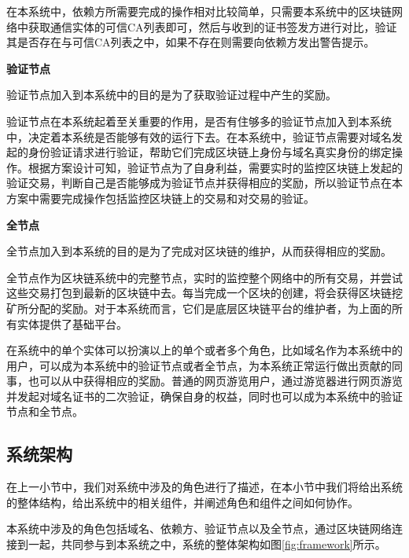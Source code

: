 在本系统中，依赖方所需要完成的操作相对比较简单，只需要本系统中的区块链网络中获取通信实体的可信CA列表即可，然后与收到的证书签发方进行对比，验证其是否存在与可信CA列表之中，如果不存在则需要向依赖方发出警告提示。


\noindent\textbf{验证节点}

验证节点加入到本系统中的目的是为了获取验证过程中产生的奖励。

验证节点在本系统起着至关重要的作用，是否有住够多的验证节点加入到本系统中，决定着本系统是否能够有效的运行下去。在本系统中，验证节点需要对域名发起的身份验证请求进行验证，帮助它们完成区块链上身份与域名真实身份的绑定操作。根据方案设计可知，验证节点为了自身利益，需要实时的监控区块链上发起的验证交易，判断自己是否能够成为验证节点并获得相应的奖励，所以验证节点在本方案中需要完成操作包括监控区块链上的交易和对交易的验证。

\noindent\textbf{全节点}

全节点加入到本系统的目的是为了完成对区块链的维护，从而获得相应的奖励。

全节点作为区块链系统中的完整节点，实时的监控整个网络中的所有交易，并尝试这些交易打包到最新的区块链中去。每当完成一个区块的创建，将会获得区块链挖矿所分配的奖励。对于本系统而言，它们是底层区块链平台的维护者，为上面的所有实体提供了基础平台。


在系统中的单个实体可以扮演以上的单个或者多个角色，比如域名作为本系统中的用户，可以成为本系统中的验证节点或者全节点，为本系统正常运行做出贡献的同事，也可以从中获得相应的奖励。普通的网页游览用户，通过游览器进行网页游览并发起对域名证书的二次验证，确保自身的权益，同时也可以成为本系统中的验证节点和全节点。



\subsection{系统架构}

在上一小节中，我们对系统中涉及的角色进行了描述，在本小节中我们将给出系统的整体结构，给出系统中的相关组件，并阐述角色和组件之间如何协作。

本系统中涉及的角色包括域名、依赖方、验证节点以及全节点，通过区块链网络连接到一起，共同参与到本系统之中，系统的整体架构如图\ref{fig:framework}所示。




